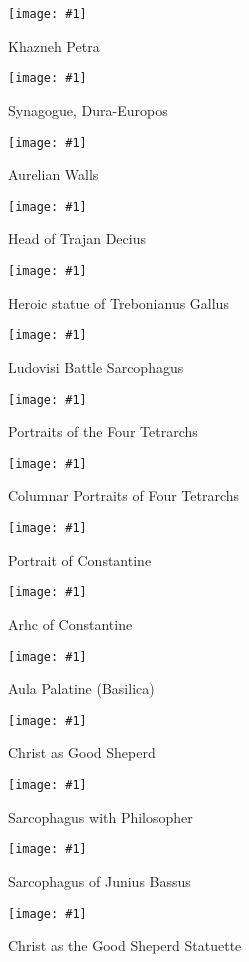 \documentclass{beamer}
\newcommand{\f}[2]{\begin{frame}\begin{figure}\g{#1}\caption{#2}\end{figure}\end{frame}}
\newcommand{\g}[1]{\texttt{[image: \#1]}}
\begin{document}
\f{ppt15/1557000013_1300_04052019_392x547.png}{Khazneh Petra}
\f{ppt15/1557000053_1300_04052019_657x518.png}{Synagogue, Dura-Europos}
\f{ppt15/1557000082_1301_04052019_766x316.png}{Aurelian Walls}
\f{ppt15/1557000091_1301_04052019_411x597.png}{Head of Trajan Decius}
\f{ppt15/1557000103_1301_04052019_357x622.png}{Heroic statue of Trebonianus Gallus}
\f{ppt15/1557000114_1301_04052019_658x410.png}{Ludovisi Battle Sarcophagus}
\f{ppt15/1557000129_1302_04052019_405x599.png}{Portraits of the Four Tetrarchs}
\f{ppt15/1557000141_1302_04052019_388x524.png}{Columnar Portraits of Four
Tetrarchs}

\f{ppt16/1557000206_1303_04052019_386x639.png}{Portrait of Constantine}
\f{ppt16/1557000228_1303_04052019_679x507.png}{Arhc of Constantine}
\f{ppt16/1557000246_1304_04052019_669x542.png}{Aula Palatine (Basilica)}
\f{ppt16/1557000259_1304_04052019_578x621.png}{Christ as Good Sheperd}
\f{ppt16/1557000266_1304_04052019_858x304.png}{Sarcophagus with Philosopher}
\f{ppt16/1557000277_1304_04052019_725x474.png}{Sarcophagus of Junius Bassus}
\f{ppt16/1557000285_1304_04052019_290x634.png}{Christ as the Good Sheperd
Statuette}
\end{document}
